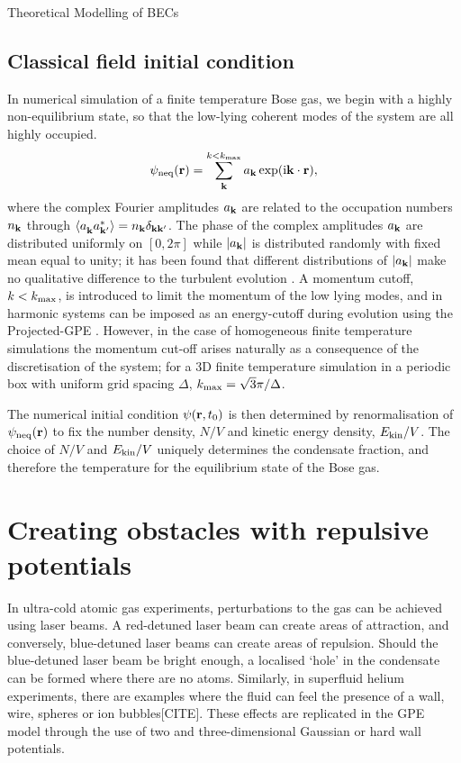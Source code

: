 \begin{chapter}{\label{cha:theoretical_model}Theoretical Modelling of BECs}
\subsection{\label{section:cfieldinitcond} Classical field initial condition}
	In numerical simulation of a finite temperature Bose gas, we begin with a highly non-equilibrium state, so that the low-lying coherent modes of the system are all highly occupied. 
	\begin{equation}
	\psi_{\rm neq}({\bf r}) = \sum \limits_{\bf k}^{k<k_{\rm max}} a_{\bf k} \exp (\mathrm{i}{\bf k}\cdot{\bf r}),
	\label{eq:cFieldIC}
	\end{equation}
	where the complex Fourier amplitudes $a_{\bf k}$ are related to the occupation numbers $n_{\bf k}$ through $\braket{a_{\bf k}^{\,}a_{\bf k'}^*} = n_{\bf k}\delta_{\bf kk'}$. The phase of the complex amplitudes $a_{\bf k}$ are distributed uniformly on $[0,2\pi]$ while $|a_{\bf k}|$ is distributed randomly with fixed mean equal to unity; it has been found that different distributions of $|a_{\bf k}|$ make no qualitative difference to the turbulent evolution \cite{PhysRevA.66.013603}. A momentum cutoff, $k<k_{\rm max}$, is introduced to limit the momentum of the low lying modes, and in harmonic systems can be imposed as an energy-cutoff during evolution using the Projected-GPE \cite{PhysRevLett.87.160402}. However, in the case of homogeneous finite temperature simulations the momentum cut-off arises naturally as a consequence of the discretisation of the system; for a 3D finite temperature simulation in a periodic box with uniform grid spacing $\Delta$, $k_{\rm max}=\sqrt{3} \pi / \Delta$.

	The numerical initial condition $\psi({\bf r},t_0)$ is then determined by renormalisation of $\psi_{\rm neq}({\bf r})$ to fix the number density, $N/V$ and kinetic energy density, $E_{\rm kin}/V$. The choice of $N/V$ and $E_{\rm kin}/V$ uniquely determines the condensate fraction, and therefore the temperature for the equilibrium state of the Bose gas.

\section{\label{section:potentials}Creating obstacles with repulsive potentials}
In ultra-cold atomic gas experiments, perturbations to the gas can be achieved using laser beams. A red-detuned laser beam can create areas of attraction, and conversely, blue-detuned laser beams can create areas of repulsion. Should the blue-detuned laser beam be bright enough, a localised `hole' in the condensate can be formed where there are no atoms. Similarly, in superfluid helium experiments, there are examples where the fluid can feel the presence of a wall, wire, spheres or ion bubbles[CITE]. These effects are replicated in the GPE model through the use of two and three-dimensional Gaussian or hard wall potentials.

\end{chapter}
